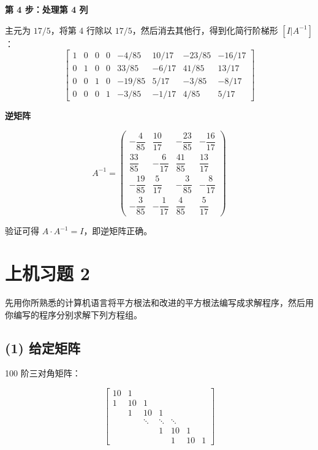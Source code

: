 \documentclass{article}
\begin{document}
\begin{solution}
  \textbf{第 4 步：处理第 4 列}

  主元为 $17/5$，将第 4 行除以 $17/5$，然后消去其他行，得到化简行阶梯形 $[I | A^{-1}]$：
  \[
    \left[
      \begin{array}{cccc|cccc}
        1 & 0 & 0 & 0 & -4/85 & 10/17 & -23/85 & -16/17 \\
        0 & 1 & 0 & 0 & 33/85 & -6/17 & 41/85 & 13/17 \\
        0 & 0 & 1 & 0 & -19/85 & 5/17 & -3/85 & -8/17 \\
        0 & 0 & 0 & 1 & -3/85 & -1/17 & 4/85 & 5/17
    \end{array}\right]
  \]

  \textbf{逆矩阵}

  \[
    A^{-1} =
    \begin{pmatrix}
      -\dfrac{4}{85} & \dfrac{10}{17} & -\dfrac{23}{85} &
      -\dfrac{16}{17} \\[6pt]
      \dfrac{33}{85} & -\dfrac{6}{17} & \dfrac{41}{85} & \dfrac{13}{17} \\[6pt]
      -\dfrac{19}{85} & \dfrac{5}{17} & -\dfrac{3}{85} & -\dfrac{8}{17} \\[6pt]
      -\dfrac{3}{85} & -\dfrac{1}{17} & \dfrac{4}{85} & \dfrac{5}{17}
    \end{pmatrix}
  \]

  验证可得 $A \cdot A^{-1} = I$，即逆矩阵正确。
\end{solution}

\section{上机习题 2}

先用你所熟悉的计算机语言将平方根法和改进的平方根法编写成求解程序，然后用你编写的程序分别求解下列方程组。

\subsection*{(1) 给定矩阵}

100 阶三对角矩阵：

\[
  \begin{bmatrix}
    10 & 1 & & & & &\\
    1 & 10 & 1 & & & & \\
    & 1 & 10 & 1 & & & \\
    & & \ddots & \ddots & \ddots & & \\
    & & & 1 & 10 & 1 & \\
    & & & & 1 & 10 & 1
  \end{bmatrix}
\]
\end{document}
